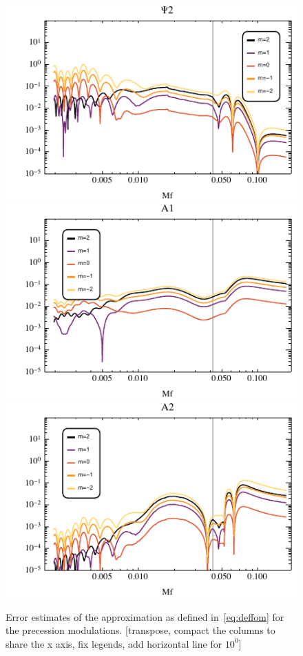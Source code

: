 \documentclass[aps,showpacs,twocolumn,
prd,superscriptaddress,nofootinbib]{revtex4-1}
\newcommand{\SM}[1]{{\color{Red} #1}}
\begin{document}
\begin{figure}
  \includegraphics[width=.32\linewidth]{plots/fom_--_Psi2.pdf}
  \hspace{0cm}
  \includegraphics[width=.32\linewidth]{plots/fom_--_A1.pdf}
  \hspace{0cm}
  \includegraphics[width=.32\linewidth]{plots/fom_--_A2.pdf}
  \caption{Error estimates of the approximation as defined in~\eqref{eq:deffom} for the precession modulations. \SM{[transpose, compact the columns to share the x axis, fix legends, add horizontal line for $10^{0}$]}}
  \label{fig:fomprec}
\end{figure}

\end{document}
